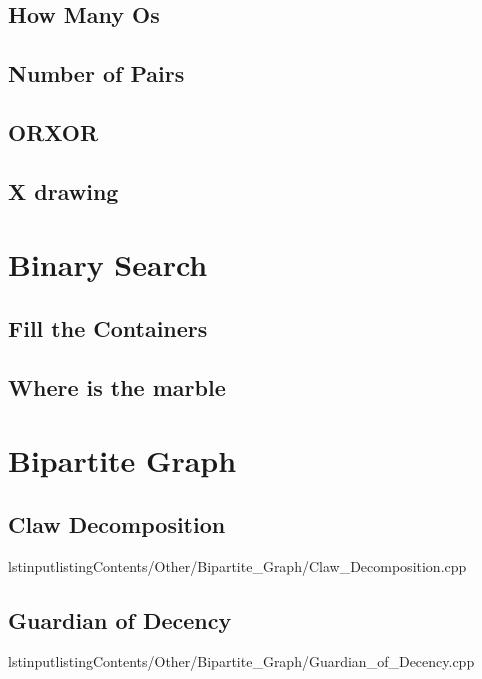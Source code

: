         \subsection{How Many Os}
                
        \subsection{Number of Pairs}
                
        \subsection{ORXOR}
                
        \subsection{X drawing}
                

\section{Binary Search}
        \subsection{Fill the Containers}
                
        \subsection{Where is the marble}
                

\section{Bipartite Graph}
        \subsection{Claw Decomposition}
                lstinputlisting{Contents/Other/Bipartite_Graph/Claw_Decomposition.cpp}
        \subsection{Guardian of Decency}
                lstinputlisting{Contents/Other/Bipartite_Graph/Guardian_of_Decency.cpp}

